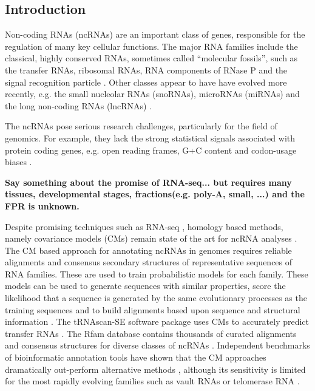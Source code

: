 \documentclass[10pt]{bmc_article}
\newenvironment{bmcformat}{\begin{raggedright}\baselineskip20pt\sloppy\setboolean{publ}{false}}{\end{raggedright}\baselineskip20pt\sloppy}
\begin{document}
\begin{bmcformat}



\section*{Introduction}

Non-coding RNAs (ncRNAs) are an important class of genes, responsible
for the regulation of many key cellular functions. The major RNA
families include the classical, highly conserved RNAs, sometimes
called ``molecular fossils'', such as the transfer RNAs, ribosomal
RNAs, RNA components of RNase P and the signal recognition particle
\cite{Jeffares:1998}. Other classes appear to have have evolved more
recently, e.g. the small nucleolar RNAs (snoRNAs), microRNAs (miRNAs)
and the long non-coding RNAs (lncRNAs) \cite{Hoeppner:2012}.


The ncRNAs pose serious research challenges, particularly for the
field of genomics. For example, they lack the strong statistical
signals associated with protein coding genes, e.g. open reading
frames, G+C content and codon-usage biases \cite{Rivas:2000}. 

{\bf Say something about the promise of RNA-seq... but requires many
  tissues, developmental stages, fractions(e.g. poly-A, small, ...)
  and the FPR is unknown.}


Despite
promising techniques such as RNA-seq \cite{Croucher:2010}, homology
based methods, namely covariance models (CMs) remain state of the art
for ncRNA analyses \cite{Sakakibara:1994,Eddy:1994,Nawrocki:2009}.
The CM based approach for annotating ncRNAs in genomes requires
reliable alignments and consensus secondary structures of
representative sequences of RNA families. These are used to train
probabilistic models for each family. These models can be used to
generate sequences with similar properties, score the likelihood that
a sequence is generated by the same evolutionary processes as the
training sequences and to build alignments based upon sequence and
structural information \cite{Sakakibara:1994,Eddy:1994,Nawrocki:2009}.
The tRNAscan-SE software package uses CMs to accurately predict
transfer RNAs \cite{Lowe:1997,Chan:2009}.  The Rfam database contains
thousands of curated alignments and consensus structures for diverse
classes of ncRNAs
\cite{Griffiths-Jones:2003,Griffiths-Jones:2005,Gardner:2009,Gardner:2011a,Burge:2013}.
Independent benchmarks of bioinformatic annotation tools have shown
that the CM approaches dramatically out-perform alternative methods
\cite{Freyhult:2007}, although its sensitivity is limited for the most
rapidly evolving families such as vault RNAs or telomerase RNA
\cite{Menzel:09a}.



\end{bmcformat}
\end{document}
